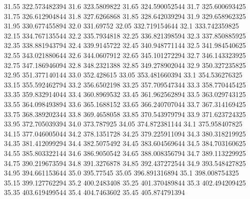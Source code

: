           31.55    322.573482394
           31.6      323.5809822
          31.65    324.590052544
           31.7    325.600693425
          31.75    326.612904844
           31.8      327.6266868
          31.85    328.642039294
           31.9    329.658962325
          31.95    330.677455894
           32.0        331.69752
          32.05    332.719154644
           32.1    333.742359825
          32.15    334.767135544
           32.2      335.7934818
          32.25    336.821398594
           32.3    337.850885925
          32.35    338.881943794
           32.4      339.9145722
          32.45    340.948771144
           32.5    341.984540625
          32.55    343.021880644
           32.6      344.0607912
          32.65    345.101272294
           32.7    346.143323925
          32.75    347.186946094
           32.8      348.2321388
          32.85    349.278902044
           32.9    350.327235825
          32.95    351.377140144
           33.0       352.428615
          33.05    353.481660394
           33.1    354.536276325
          33.15    355.592462794
           33.2      356.6502198
          33.25    357.709547344
           33.3    358.770445425
          33.35    359.832914044
           33.4      360.8969532
          33.45    361.962562894
           33.5    363.029743125
          33.55    364.098493894
           33.6      365.1688152
          33.65    366.240707044
           33.7    367.314169425
          33.75    368.389202344
           33.8      369.4658058
          33.85    370.543979794
           33.9    371.623724325
          33.95    372.705039394
           34.0       373.787925
          34.05    374.872381144
           34.1    375.958407825
          34.15    377.046005044
           34.2      378.1351728
          34.25    379.225911094
           34.3    380.318219925
          34.35    381.412099294
           34.4      382.5075492
          34.45    383.604569644
           34.5    384.703160625
          34.55    385.803322144
           34.6      386.9050542
          34.65    388.008356794
           34.7    389.113229925
          34.75    390.219673594
           34.8      391.3276878
          34.85    392.437272544
           34.9    393.548427825
          34.95    394.661153644
           35.0        395.77545
          35.05    396.891316894
           35.1    398.008754325
          35.15    399.127762294
           35.2      400.2483408
          35.25    401.370489844
           35.3    402.494209425
          35.35    403.619499544
           35.4      404.7463602
          35.45    405.874791394
